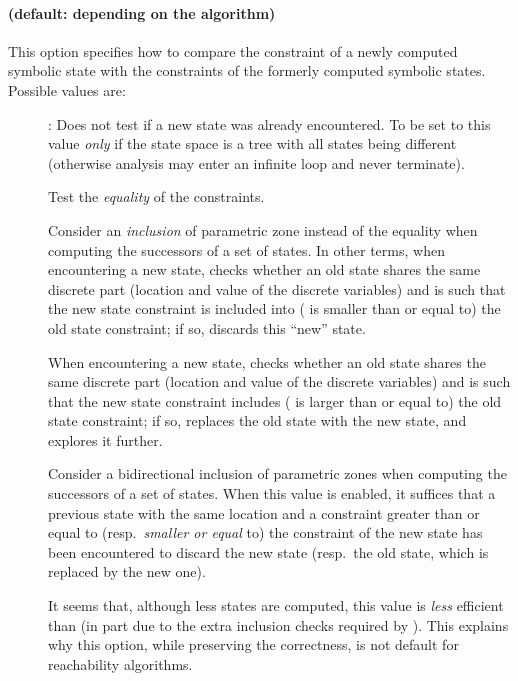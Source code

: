 \paragraph{ (default: depending on the algorithm)}
This option specifies how to compare the constraint of a newly computed symbolic state with the constraints of the formerly computed symbolic states.
Possible values are:
\begin{description}
	\item[]:
	Does not test if a new state was already encountered.
To be set to this value \emph{only} if the state space is a tree with all states being different (otherwise analysis may enter an infinite loop and never terminate).

	\item[]
	Test the \emph{equality} of the constraints.

	\item[]
Consider an \emph{inclusion} of parametric zone instead of the equality when computing the successors of a set of states.
In other terms, when encountering a new state, \imitator{} checks whether an old state shares the same discrete part (location and value of the discrete variables) and is such that the new state constraint is included into (\ie{} is smaller than or equal to) the old state constraint; if so, \imitator{} discards this ``new'' state.

	\item[]
When encountering a new state, \imitator{} checks whether an old state shares the same discrete part (location and value of the discrete variables) and is such that the new state constraint includes (\ie{} is larger than or equal to) the old state constraint; if so, \imitator{} replaces the old state with the new state, and explores it further.

	\item[]
Consider a bidirectional inclusion of parametric zones when computing the successors of a set of states.
When this value is enabled, it suffices that a previous state with the same location and a constraint greater than or equal to (resp.\ \emph{smaller or equal} to) the constraint of the new state has been encountered to discard the new state (resp.\ the old state, which is replaced by the new one).

It seems that, although less states are computed, this value is \emph{less} efficient than  (in part due to the extra inclusion checks required by ).
This explains why this option, while preserving the correctness, is not default for reachability algorithms.
\end{description}

